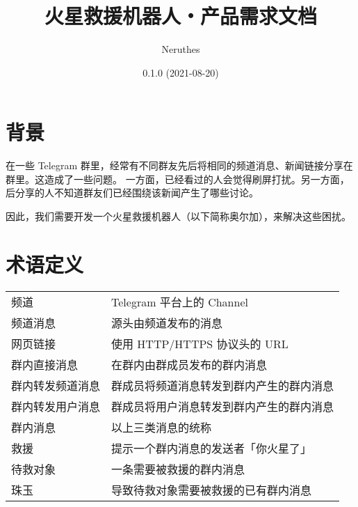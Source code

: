 \documentclass[a4paper,12pt]{article}
\title{火星救援机器人・产品需求文档}
\author{Neruthes}
\date{0.1.0 (2021-08-20)}
\begin{document}
    \raggedbottom\raggedright
    

    
    
    \pagestyle{plain}

    \sffamily

    \maketitle


    \baselineskip=18pt

    \section{背景}

    在一些 Telegram 群里，经常有不同群友先后将相同的频道消息、新闻链接分享在群里。这造成了一些问题。
    一方面，已经看过的人会觉得刷屏打扰。另一方面，后分享的人不知道群友们已经围绕该新闻产生了哪些讨论。

    因此，我们需要开发一个火星救援机器人（以下简称奥尔加），来解决这些困扰。

    \section{术语定义}

    \begin{tabu}{|X|X[2.5]|}
        \hline
         &  \\
        \hline
        {频道} & {Telegram 平台上的 Channel} \\
        {频道消息} & {源头由频道发布的消息} \\
        {网页链接} & {使用 HTTP/HTTPS 协议头的 URL} \\
        {群内直接消息} & {在群内由群成员发布的群内消息} \\
        {群内转发频道消息} & {群成员将频道消息转发到群内产生的群内消息} \\
        {群内转发用户消息} & {群成员将用户消息转发到群内产生的群内消息} \\
        {群内消息} & {以上三类消息的统称} \\
        {救援} & {提示一个群内消息的发送者「你火星了」} \\
        {待救对象} & {一条需要被救援的群内消息} \\
        {珠玉} & {导致待救对象需要被救援的已有群内消息} \\
        \hline
    \end{tabu}
\end{document}
